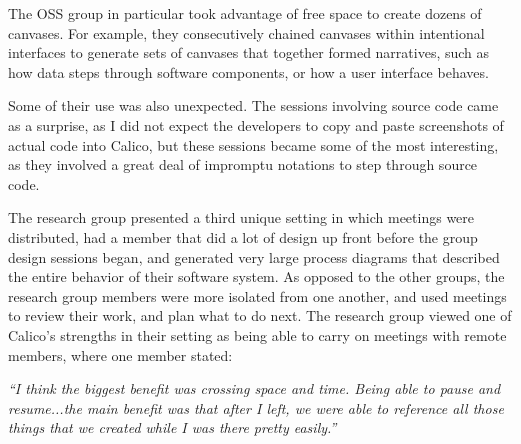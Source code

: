 The OSS group in particular took advantage of free space to create dozens of canvases. For example, they consecutively chained canvases within intentional interfaces to generate sets of canvases that together formed narratives, such as how data steps through software components, or how a user interface behaves. 

Some of their use was also unexpected. The sessions involving source code came as a surprise, as I did not expect the developers to copy and paste screenshots of actual code into Calico, but these sessions became some of the most interesting, as they involved a great deal of impromptu notations to step through source code.


The research group presented a third unique setting in which meetings were distributed, had a member that did a lot of design up front before the group design sessions began, and generated very large process diagrams that described the entire behavior of their software system. As opposed to the other groups, the research group members were more isolated from one another, and used meetings to review their work, and plan what to do next. The research group viewed one of Calico's strengths in their setting as being able to carry on meetings with remote members, where one member stated: 

\begin{myindentpar}{1cm}
\emph{``I think the biggest benefit was crossing space and time. Being able to pause and resume...the main benefit was that after I left, we were able to reference all those things that we created while I was there pretty easily.''}
\end{myindentpar}

